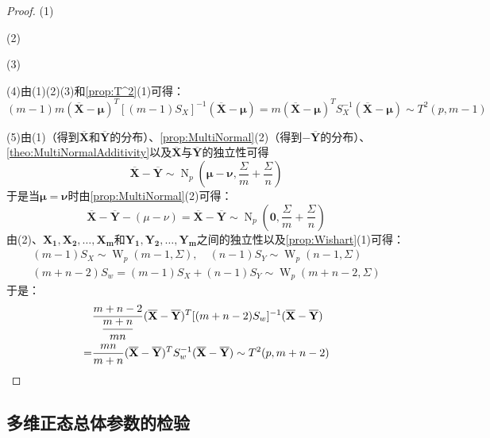 \begin{proof}
	(1)\par
	(2)\par
	(3)\par
	(4)由(1)(2)(3)和\cref{prop:T^2}(1)可得：
	\begin{equation*}
		(m-1)m(\overline{\mathbf{X}}-\boldsymbol{\mu})^T[(m-1)S_X]^{-1}(\overline{\mathbf{X}}-\boldsymbol{\mu})=m(\overline{\mathbf{X}}-\boldsymbol{\mu})^TS_X^{-1}(\overline{\mathbf{X}}-\boldsymbol{\mu})\sim T^2(p,m-1)
	\end{equation*}\par
	(5)由(1)（得到$\overline{\mathbf{X}}$和$\overline{\mathbf{Y}}$的分布）、\cref{prop:MultiNormal}(2)（得到$-\overline{\mathbf{Y}}$的分布）、\cref{theo:MultiNormalAdditivity}以及$\overline{\mathbf{X}}$与$\overline{\mathbf{Y}}$的独立性可得
	\begin{equation*}
		\overline{\mathbf{X}}-\overline{\mathbf{Y}}\sim \operatorname{N}_p\left(\boldsymbol{\mu}-\boldsymbol{\nu},\frac{\Sigma}{m}+\frac{\Sigma}{n}\right)
	\end{equation*}
	于是当$\boldsymbol{\mu}=\boldsymbol{\nu}$时由\cref{prop:MultiNormal}(2)可得：
	\begin{equation*}
		\overline{\mathbf{X}}-\overline{\mathbf{Y}}-(\mu-\nu)=\overline{\mathbf{X}}-\overline{\mathbf{Y}}\sim \operatorname{N}_p\left(\mathbf{0},\frac{\Sigma}{m}+\frac{\Sigma}{n}\right)
	\end{equation*}
	由(2)、$\mathbf{X_1},\mathbf{X_2},\dots,\mathbf{X_m}$和$\mathbf{Y_1},\mathbf{Y_2},\dots,\mathbf{Y_m}$之间的独立性以及\cref{prop:Wishart}(1)可得：
	\begin{gather*}
		(m-1)S_X\sim\operatorname{W}_p(m-1,\Sigma),\quad(n-1)S_Y\sim\operatorname{W}_p(n-1,\Sigma) \\
		(m+n-2)S_w=(m-1)S_X+(n-1)S_Y\sim\operatorname{W}_p(m+n-2,\Sigma)
	\end{gather*}
	于是：
	\begin{align*}
		&\frac{m+n-2}{\dfrac{m+n}{mn}}(\overline{\mathbf{X}}-\overline{\mathbf{Y}})^T[(m+n-2)S_{w}]^{-1}(\overline{\mathbf{X}}-\overline{\mathbf{Y}}) \\
		=&\frac{mn}{m+n}(\overline{\mathbf{X}}-\overline{\mathbf{Y}})^TS_{w}^{-1}(\overline{\mathbf{X}}-\overline{\mathbf{Y}})\sim T^2(p,m+n-2)\qedhere
	\end{align*}
\end{proof}

\subsection{多维正态总体参数的检验}

